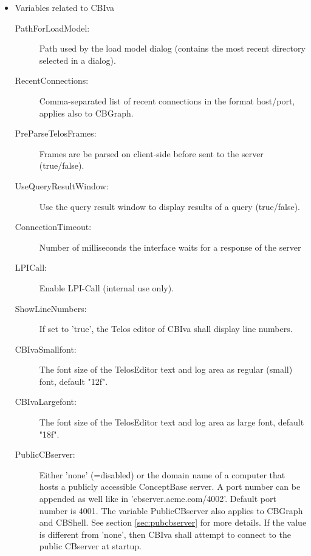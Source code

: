 \begin{itemize}
\item Variables related to CBIva
\begin{description}
\item[PathForLoadModel:] Path used by the load model dialog (contains the most recent directory selected in a dialog).
\item[RecentConnections:] Comma-separated list of recent connections in the format host/port, applies also to CBGraph.
\item[PreParseTelosFrames:] Frames are be parsed on client-side before sent to the server (true/false).
\item[UseQueryResultWindow:] Use the query result window to display results of a query (true/false).
\item[ConnectionTimeout:] Number of milliseconds the interface waits for a response of the server
\item[LPICall:] Enable LPI-Call (internal use only).
\item[ShowLineNumbers:] If set to 'true', the Telos editor of CBIva shall display line numbers.
\item[CBIvaSmallfont:] The font size of the TelosEditor text and log area as regular (small) font, default "12f".
\item[CBIvaLargefont:] The font size of the TelosEditor text and log area as large font, default "18f".
\item[PublicCBserver:] Either 'none' (=disabled) or the domain name of a computer that hosts a publicly accessible
ConceptBase server. A port number can be appended as well like in 'cbserver.acme.com/4002'. Default port number is 4001.
The variable PublicCBserver also applies to CBGraph and CBShell. See section \ref{sec:pubcbserver} for more details. If the value is different
from 'none', then CBIva shall attempt to connect to the public CBserver at startup.
\end{description}



\end{itemize}
